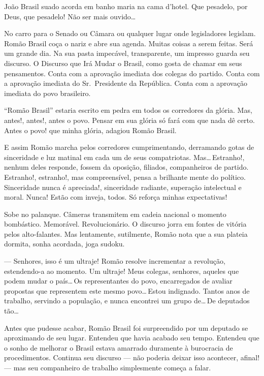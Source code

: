 João Brasil suado acorda em banho maria na cama d'hotel. Que pesadelo, por Deus, que pesadelo! Não ser mais ouvido\ldots



No carro para o Senado ou Câmara ou qualquer lugar onde legisladores legislam. Romão Brasil coça o nariz e abre sua agenda. Muitas coisas a serem feitas. Será um grande dia. Na sua pasta impecável, transparente, um impresso guarda seu discurso. O Discurso que Irá Mudar o Brasil, como gosta de chamar em seus pensamentos. Conta com a aprovação imediata dos colegas do partido. Conta com a aprovação imediata do Sr.~Presidente da República. Conta com a aprovação imediata do povo brasileiro.

``Romão Brasil'' estaria escrito em pedra em todos os corredores da glória. Mas, antes!, antes!, antes o povo. Pensar em sua glória só fará com que nada dê certo. Antes o povo! que minha glória, adagiou Romão Brasil.

E assim Romão marcha pelos corredores cumprimentando, derramando gotas de sinceridade e luz matinal em cada um de seus compatriotas. Mas\ldots\,Estranho!, nenhum deles responde, fossem da oposição, filiados, companheiros de partido. Estranho!, estranho!, mas compreensível, pensa a brilhante mente do político. Sinceridade nunca é apreciada!, sinceridade radiante, superação intelectual e moral. Nunca! Estão com inveja, todos. Só reforça minhas expectativas!

Sobe no palanque. Câmeras transmitem em cadeia nacional o momento bombástico. Memorável. Revolucionário. O discurso jorra em fontes de vitória pelos alto-falantes. Mas lentamente, sutilmente, Romão nota que a sua plateia dormita, sonha acordada, joga sudoku.

--- Senhores, isso é um ultraje! Romão resolve incrementar a revolução, estendendo-a ao momento. Um ultraje! Meus colegas, senhores, aqueles que podem mudar o país\ldots\,Os representantes do povo, encarregados de avaliar propostas que representem este mesmo povo\ldots\,Estou indignado. Tantos anos de trabalho, servindo a população, e nunca encontrei um grupo de\ldots\,De deputados tão\ldots

Antes que pudesse acabar, Romão Brasil foi surpreendido por um deputado se aproximando de seu lugar. Entendeu que havia acabado seu tempo. Entendeu que o sonho de melhorar o Brasil estava amarrado duramente à burocracia de procedimentos. Continua seu discurso --- não poderia deixar isso acontecer, afinal! --- mas seu companheiro de trabalho simplesmente começa a falar.

